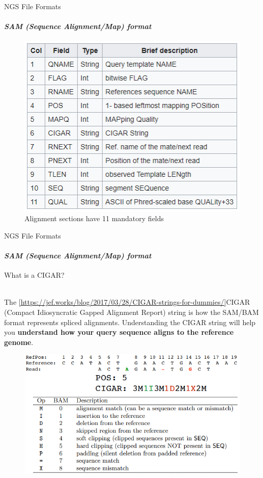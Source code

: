 \documentclass{if-beamer}
\begin{document}
\begin{frame}{NGS File Formats}
\framesubtitle{\emph{SAM (Sequence Alignment/Map) format}}
\begin{figure}
\centering
\includegraphics[scale=0.65]{sam_alignment_meaning.PNG}
\caption{Alignment sections have 11 mandatory fields}
\end{figure}
\end{frame}
\begin{frame}{NGS File Formats}
\framesubtitle{\emph{SAM (Sequence Alignment/Map) format}}
\begin{huge}
\centering
What is a CIGAR?
\\~\\
\end{huge}
The \cref{https://jef.works/blog/2017/03/28/CIGAR-strings-for-dummies/}{CIGAR} (Compact Idiosyncratic Gapped Alignment Report) string is how the SAM/BAM format represents spliced alignments. Understanding the CIGAR string will help you \textbf{understand how your query sequence aligns to the reference genome}.
\begin{figure}
\centering
\includegraphics[scale=0.5]{cigar.PNG}
\end{figure}
\end{frame}
\end{document}
